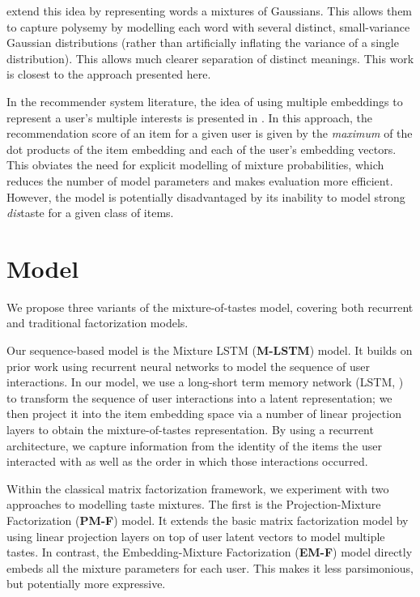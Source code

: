 \documentclass[sigconf]{acmart}
\begin{document}
\citet{athiwaratkun2017multimodal} extend this idea by representing words a mixtures of Gaussians. This allows them to capture polysemy by modelling each word with several distinct, small-variance Gaussian distributions (rather than artificially inflating the variance of a single distribution). This allows much clearer separation of distinct meanings. This work is closest to the approach presented here.

In the recommender system literature, the idea of using multiple embeddings to represent a user's multiple interests is presented in \citet{weston2013nonlinear}. In this approach, the recommendation score of an item for a given user is given by the \emph{maximum} of the dot products of the item embedding and each of the user's embedding vectors. This obviates the need for explicit modelling of mixture probabilities, which reduces the number of model parameters and makes evaluation more efficient. However, the model is potentially disadvantaged by its inability to model strong \emph{dis}taste for a given class of items.

\section{Model}
We propose three variants of the mixture-of-tastes model, covering both recurrent and traditional factorization models.

Our sequence-based model is the Mixture LSTM (\textbf{M-LSTM}) model. It builds on prior work \citep{wu2017recurrent, hidasi2015session} using recurrent neural networks to model the sequence of user interactions. In our model, we use a long-short term memory network (LSTM, \cite{hochreiter1997long}) to transform the sequence of user interactions into a latent representation; we then project it into the item embedding space via a number of linear projection layers to obtain the mixture-of-tastes representation. By using a recurrent architecture, we capture information from the identity of the items the user interacted with as well as the order in which those interactions occurred.

Within the classical matrix factorization framework, we experiment with two approaches to modelling taste mixtures. The first is the Projection-Mixture Factorization (\textbf{PM-F}) model. It extends the basic matrix factorization model by using linear projection layers on top of user latent vectors to model multiple tastes. In contrast, the Embedding-Mixture Factorization (\textbf{EM-F}) model directly embeds all the mixture parameters for each user. This makes it less parsimonious, but potentially more expressive.
\end{document}
